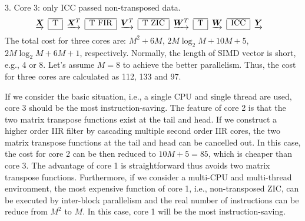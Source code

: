 3. Core 3: only ICC passed non-transposed data.
\begin{equation*}
    \label{eq:iir_core_3_icc_non_trans}
    \begin{aligned}
        & \begin{array}{c|c|c|c|c|c|c|c|c|c|c}
            \cline{2-2}
            \cline{4-4}
            \cline{6-6}
            \cline{8-8}
            \cline{10-10}
            \underrightarrow{\bm{X}} & \text{T} & \underrightarrow{\bm{X}^T} & \text{T FIR} & \underrightarrow{\bm{V}^T} & \text{T ZIC} & \underrightarrow{\bm{W}^T} & \text{T} & \underrightarrow{\bm{W}} & \text{ICC} & \underrightarrow{\bm{Y}} \\
            \cline{2-2}
            \cline{4-4}
            \cline{6-6}
            \cline{8-8}
            \cline{10-10}
    \end{array}
\end{aligned}
\end{equation*}
The total cost for three cores are: $M^2{+}6M$, $2M{\log_2}M{+}10M{+}5$, $2M{\log_2}M{+}6M{+}1$, respectively.
Normally, the length of SIMD vector is short, e.g., 4 or 8. Let's assume $M=8$ to achieve the better
parallelism. Thus, the cost for three cores are calculated as 112, 133 and 97.

If we consider the basic situation, i.e., a single CPU and single thread are used, core 3 should be
the most instruction-saving. The feature of core 2 is that the two matrix transpose functions exist at the tail and head.
If we construct a higher order IIR filter by cascading multiple second order IIR cores, the two matrix transpose functions
at the tail and head can be cancelled out. In this case, the cost for core 2 can be then reduced to $10M{+}5=85$, which is cheaper
than core 3. The advantage of core 1 is straightforward thus avoids two matrix transpose functions.
Furthermore, if we consider a multi-CPU and multi-thread environment, the most expensive function of core 1, i.e., non-transposed ZIC,
can be executed by inter-block parallelism and the real number of instructions can be reduce from $M^2$ to $M$. In this case, core 1 will be the most instruction-saving.

